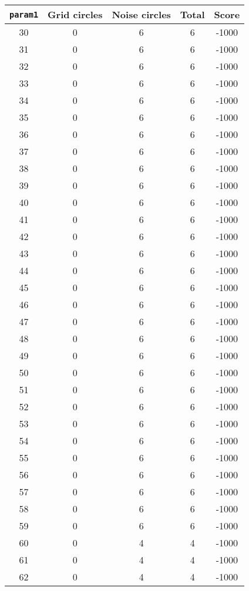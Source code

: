 \documentclass[letterpaper, 12pt]{article}
\begin{document}
\begin{longtable}{|c|c|c|c|c|}
\hline
\textbf{\texttt{param1}} & \textbf{Grid circles} & \textbf{Noise circles} & \textbf{Total} & \textbf{Score} \\
\hline
30 & 0 & 6 & 6 & -1000 \\
\hline
31 & 0 & 6 & 6 & -1000 \\
\hline
32 & 0 & 6 & 6 & -1000 \\
\hline
33 & 0 & 6 & 6 & -1000 \\
\hline
34 & 0 & 6 & 6 & -1000 \\
\hline
35 & 0 & 6 & 6 & -1000 \\
\hline
36 & 0 & 6 & 6 & -1000 \\
\hline
37 & 0 & 6 & 6 & -1000 \\
\hline
38 & 0 & 6 & 6 & -1000 \\
\hline
39 & 0 & 6 & 6 & -1000 \\
\hline
40 & 0 & 6 & 6 & -1000 \\
\hline
41 & 0 & 6 & 6 & -1000 \\
\hline
42 & 0 & 6 & 6 & -1000 \\
\hline
43 & 0 & 6 & 6 & -1000 \\
\hline
44 & 0 & 6 & 6 & -1000 \\
\hline
45 & 0 & 6 & 6 & -1000 \\
\hline
46 & 0 & 6 & 6 & -1000 \\
\hline
47 & 0 & 6 & 6 & -1000 \\
\hline
48 & 0 & 6 & 6 & -1000 \\
\hline
49 & 0 & 6 & 6 & -1000 \\
\hline
50 & 0 & 6 & 6 & -1000 \\
\hline
51 & 0 & 6 & 6 & -1000 \\
\hline
52 & 0 & 6 & 6 & -1000 \\
\hline
53 & 0 & 6 & 6 & -1000 \\
\hline
54 & 0 & 6 & 6 & -1000 \\
\hline
55 & 0 & 6 & 6 & -1000 \\
\hline
56 & 0 & 6 & 6 & -1000 \\
\hline
57 & 0 & 6 & 6 & -1000 \\
\hline
58 & 0 & 6 & 6 & -1000 \\
\hline
59 & 0 & 6 & 6 & -1000 \\
\hline
60 & 0 & 4 & 4 & -1000 \\
\hline
61 & 0 & 4 & 4 & -1000 \\
\hline
62 & 0 & 4 & 4 & -1000 \\

\end{longtable}
\end{document}
